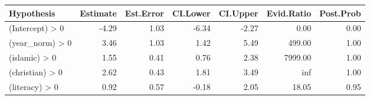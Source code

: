 \begin{tabular}{lrrrrrr}
\toprule
Hypothesis & Estimate & Est.Error & CI.Lower & CI.Upper & Evid.Ratio & Post.Prob \\
\midrule
(Intercept) > 0 & -4.29 & 1.03 & -6.34 & -2.27 & 0.00 & 0.00 \\
(year_norm) > 0 & 3.46 & 1.03 & 1.42 & 5.49 & 499.00 & 1.00 \\
(islamic) > 0 & 1.55 & 0.41 & 0.76 & 2.38 & 7999.00 & 1.00 \\
(christian) > 0 & 2.62 & 0.43 & 1.81 & 3.49 & inf & 1.00 \\
(literacy) > 0 & 0.92 & 0.57 & -0.18 & 2.05 & 18.05 & 0.95 \\
\bottomrule
\end{tabular}
